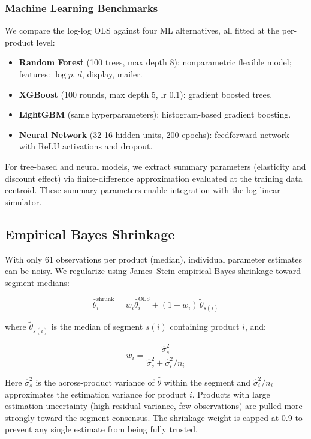 \documentclass[12pt,a4paper]{article}
\begin{document}
\subsubsection{Machine Learning Benchmarks}

We compare the log-log OLS against four ML alternatives, all fitted
at the per-product level:

\begin{itemize}[nosep]
\item \textbf{Random Forest} (100 trees, max depth 8): nonparametric
flexible model; features: $\log p$, $d$, display, mailer.
\item \textbf{XGBoost} (100 rounds, max depth 5, lr 0.1): gradient
boosted trees.
\item \textbf{LightGBM} (same hyperparameters): histogram-based
gradient boosting.
\item \textbf{Neural Network} (32-16 hidden units, 200 epochs):
feedforward network with ReLU activations and dropout.
\end{itemize}

For tree-based and neural models, we extract summary parameters
(elasticity and discount effect) via finite-difference
approximation evaluated at the training data centroid. These
summary parameters enable integration with the log-linear simulator.

\subsection{Empirical Bayes Shrinkage}
\label{sec:shrinkage}

With only 61 observations per product (median), individual
parameter estimates can be noisy. We regularize using James--Stein
empirical Bayes shrinkage toward segment medians:

\begin{equation}
\hat{\theta}_i^{\text{shrunk}} = w_i \hat{\theta}_i^{\text{OLS}}
+ (1 - w_i) \, \tilde{\theta}_{s(i)}
\end{equation}

where $\tilde{\theta}_{s(i)}$ is the median of segment $s(i)$
containing product $i$, and:

\begin{equation}
\label{eq:js-weight}
w_i = \frac{\hat{\sigma}_{s}^2}
{\hat{\sigma}_{s}^2 + \hat{\sigma}_i^2 / n_i}
\end{equation}

Here $\hat{\sigma}_{s}^2$ is the across-product variance of
$\hat{\theta}$ within the segment and $\hat{\sigma}_i^2 / n_i$
approximates the estimation variance for product $i$. Products with
large estimation uncertainty (high residual variance, few
observations) are pulled more strongly toward the segment consensus.
The shrinkage weight is capped at 0.9 to prevent any single estimate
from being fully trusted.
\end{document}
